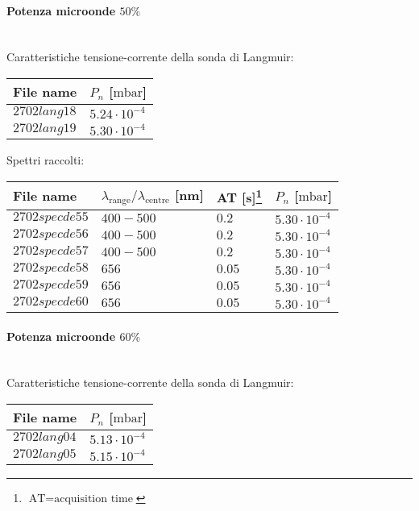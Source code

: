 \paragraph*{Potenza microonde $\text{50\%}$} ~\\
Caratteristiche tensione-corrente della sonda di Langmuir:
\begin{center}
\begin{tabular}{p{3cm}p{3cm}}
\toprule
File name	&$P_n$ [$\si{\milli\bar}$]\\
\midrule
$2702lang18$	&$5.24\cdot10^{-4}$\\
$2702lang19$	&$5.30\cdot10^{-4}$\\
\bottomrule
\end{tabular}
\end{center}

Spettri raccolti:
\begin{center}
\begin{tabular}{p{3cm}p{4cm}p{2cm}p{3cm}}
\toprule
File name	&$\lambda_\text{range}\text{/}\lambda_\text{centre}$ [nm] 	&AT [s]\footnote{$\text{AT}=\text{acquisition time}$} &$P_n$ [$\si{\milli\bar}$]\\
\midrule
$2702specde55$	&$400-500$	&$0.2$		&$5.30\cdot10^{-4}$\\
$2702specde56$	&$400-500$	&$0.2$		&$5.30\cdot10^{-4}$\\
$2702specde57$	&$400-500$	&$0.2$		&$5.30\cdot10^{-4}$\\
$2702specde58$	&$656$		&$0.05$		&$5.30\cdot10^{-4}$\\
$2702specde59$	&$656$		&$0.05$		&$5.30\cdot10^{-4}$\\
$2702specde60$	&$656$		&$0.05$		&$5.30\cdot10^{-4}$\\
\bottomrule
\end{tabular}
\end{center}

\paragraph*{Potenza microonde $\text{60\%}$} ~\\
Caratteristiche tensione-corrente della sonda di Langmuir:
\begin{center}
\begin{tabular}{p{3cm}p{3cm}}
\toprule
File name	&$P_n$ [$\si{\milli\bar}$]\\
\midrule
$2702lang04$	&$5.13\cdot10^{-4}$\\
$2702lang05$	&$5.15\cdot10^{-4}$\\
\bottomrule
\end{tabular}
\end{center}


